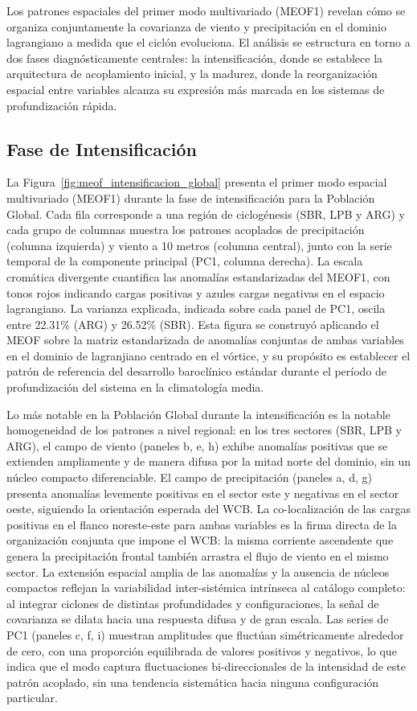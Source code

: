 Los patrones espaciales del primer modo multivariado (MEOF1) revelan cómo se organiza conjuntamente la covarianza de viento y precipitación en el dominio lagrangiano a medida que el ciclón evoluciona. 
El análisis se estructura en torno a dos fases diagnósticamente centrales: la intensificación, donde se establece la arquitectura de acoplamiento inicial, y la madurez, donde la reorganización espacial entre variables alcanza su expresión más marcada en los sistemas de profundización rápida.

\subsection{Fase de Intensificación}
\label{subsec:meof_intensificacion}

La Figura~\ref{fig:meof_intensificacion_global} presenta el primer modo espacial multivariado (MEOF1) durante la fase de intensificación para la Población Global. 
Cada fila corresponde a una región de ciclogénesis (SBR, LPB y ARG) y cada grupo de columnas muestra los patrones acoplados de precipitación (columna izquierda) y viento a 10 metros (columna central), junto con la serie temporal de la componente principal (PC1, columna derecha). 
La escala cromática divergente cuantifica las anomalías estandarizadas del MEOF1, con tonos rojos indicando cargas positivas y azules cargas negativas en el espacio lagrangiano. La varianza explicada, indicada sobre cada panel de PC1, oscila entre 22.31\% (ARG) y 26.52\% (SBR). 
Esta figura se construyó aplicando el MEOF sobre la matriz estandarizada de anomalías conjuntas de ambas variables en el dominio de lagranjiano centrado en el vórtice, y su propósito es establecer el patrón de referencia del desarrollo baroclínico estándar durante el período de profundización del sistema en la climatología media.

Lo más notable en la Población Global durante la intensificación es la notable homogeneidad de los patrones a nivel regional: en los tres sectores (SBR, LPB y ARG), el campo de viento (paneles b, e, h) exhibe anomalías positivas que se extienden ampliamente y de manera difusa por la mitad norte del dominio, sin un núcleo compacto diferenciable. 
El campo de precipitación (paneles a, d, g) presenta anomalías levemente positivas en el sector este y negativas en el sector oeste, siguiendo la orientación esperada del WCB. La co-localización de las cargas positivas en el flanco noreste-este para ambas variables es la firma directa de la organización conjunta que impone el WCB: la misma corriente ascendente que genera la precipitación frontal también arrastra el flujo de viento en el mismo sector. 
La extensión espacial amplia de las anomalías y la ausencia de núcleos compactos reflejan la variabilidad inter-sistémica intrínseca al catálogo completo: al integrar ciclones de distintas profundidades y configuraciones, la señal de covarianza se dilata hacia una respuesta difusa y de gran escala. 
Las series de PC1 (paneles c, f, i) muestran amplitudes que fluctúan simétricamente alrededor de cero, con una proporción equilibrada de valores positivos y negativos, lo que indica que el modo captura fluctuaciones bi-direccionales de la intensidad de este patrón acoplado, sin una tendencia sistemática hacia ninguna configuración particular.

